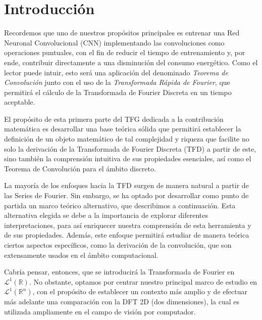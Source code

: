  
\chapter{Introducción}

\noindent Recordemos que uno de nuestros propósitos principales es entrenar una Red Neuronal Convolucional (CNN) implementando las convoluciones como operaciones puntuales, con el fin de reducir el tiempo de entrenamiento y, por ende, contribuir directamente a una disminución del consumo energético. Como el lector puede intuir, esto será una aplicación del denominado \textit{Teorema de Convolución} junto con el uso de la \textit{Transformada Rápida de Fourier}, que permitirá el cálculo de la Transformada de Fourier Discreta en un tiempo aceptable. 
\vspace{0.2cm}

\noindent El propósito de esta primera parte del TFG dedicada a la contribución matemática es desarrollar una base teórica sólida que permitirá establecer la definición de un objeto matemático de tal complejidad y riqueza que facilite no solo la derivación de la Transformada de Fourier Discreta (TFD) a partir de este, sino también la comprensión intuitiva de sus propiedades esenciales, así como el Teorema de Convolución para el ámbito discreto.

\vspace{0.2cm}


\noindent La mayoría de los enfoques hacia la TFD surgen de manera natural a partir de las Series de Fourier. Sin embargo, se ha optado por desarrollar como punto de partida un marco teórico alternativo, que describimos a continuación. Esta alternativa elegida se debe a la importancia de explorar diferentes interpretaciones, para así enriquecer nuestra comprensión de esta herramienta y de sus propiedades. Además, este enfoque permitirá estudiar de manera teórica ciertos aspectos específicos, como la derivación de la convolución, que son extensamente usados en el ámbito computacional. 


\vspace{0.2cm}

\noindent 
Cabría pensar, entonces, que se introducirá la Transformada de Fourier en $\mathscr{L}^1(\mathbb{R})$. No obstante, optamos por centrar nuestro principal marco de estudio en $\mathscr{L}^1(\mathbb{R}^n)$, con el propósito de establecer un contexto más amplio  y  de efectuar más adelante una comparación con la DFT 2D (dos dimensiones), la cual es utilizada ampliamente en el campo de visión por computador. 
\vspace{0.2cm}

